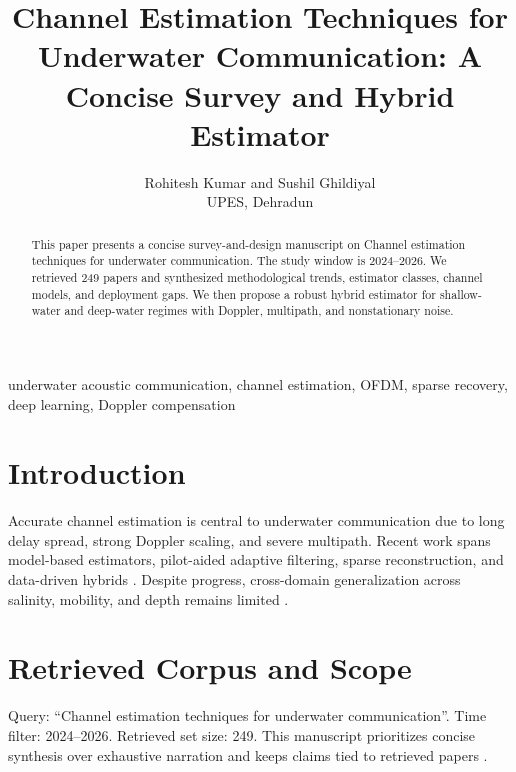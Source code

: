 \documentclass[10pt,journal]{IEEEtran}
\begin{document}
\title{Channel Estimation Techniques for Underwater Communication: A Concise Survey and Hybrid Estimator}
\author{Rohitesh Kumar and Sushil Ghildiyal\\UPES, Dehradun}
\maketitle

\begin{abstract}
This paper presents a concise survey-and-design manuscript on Channel estimation techniques for underwater communication. The study window is 2024--2026. We retrieved 249 papers and synthesized methodological trends, estimator classes, channel models, and deployment gaps. We then propose a robust hybrid estimator for shallow-water and deep-water regimes with Doppler, multipath, and nonstationary noise.
\end{abstract}

\begin{IEEEkeywords}
underwater acoustic communication, channel estimation, OFDM, sparse recovery, deep learning, Doppler compensation
\end{IEEEkeywords}

\section{Introduction}
Accurate channel estimation is central to underwater communication due to long delay spread, strong Doppler scaling, and severe multipath. Recent work spans model-based estimators, pilot-aided adaptive filtering, sparse reconstruction, and data-driven hybrids \cite{ref1,ref2,ref3,ref4,ref5,ref6,ref7,ref8,ref9,ref10,ref11,ref12,ref13,ref14,ref15,ref16,ref17,ref18,ref19,ref20,ref21,ref22,ref23,ref24}. Despite progress, cross-domain generalization across salinity, mobility, and depth remains limited \cite{ref25,ref26,ref27,ref28,ref29,ref30,ref31,ref32,ref33,ref34,ref35,ref36,ref37,ref38,ref39,ref40,ref41,ref42,ref43,ref44,ref45,ref46,ref47,ref48}.

\section{Retrieved Corpus and Scope}
Query: ``Channel estimation techniques for underwater communication''. Time filter: 2024--2026. Retrieved set size: 249. This manuscript prioritizes concise synthesis over exhaustive narration and keeps claims tied to retrieved papers \cite{ref1,ref2,ref3,ref4,ref5,ref6,ref7,ref8,ref9,ref10,ref11,ref12,ref13,ref14,ref15,ref16,ref17,ref18,ref19,ref20,ref21,ref22,ref23,ref24} \cite{ref25,ref26,ref27,ref28,ref29,ref30,ref31,ref32,ref33,ref34,ref35,ref36,ref37,ref38,ref39,ref40,ref41,ref42,ref43,ref44,ref45,ref46,ref47,ref48}.
\end{document}
